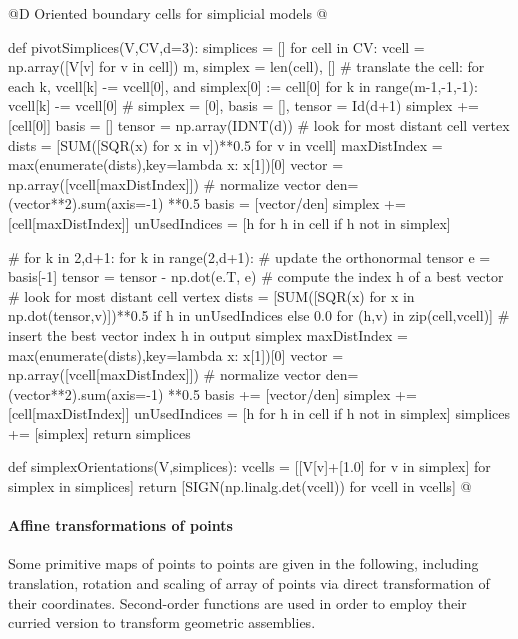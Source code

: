 \documentclass[11pt,oneside]{article}    %
\begin{document}
@D Oriented boundary cells for simplicial models
@{def pivotSimplices(V,CV,d=3):
    simplices = []
    for cell in CV:
        vcell = np.array([V[v] for v in cell])
        m, simplex = len(cell), []
        # translate the cell: for each k, vcell[k] -= vcell[0], and simplex[0] := cell[0]
        for k in range(m-1,-1,-1): vcell[k] -= vcell[0]
        # simplex = [0], basis = [], tensor = Id(d+1)
        simplex += [cell[0]]
        basis = []
        tensor = np.array(IDNT(d))
        # look for most distant cell vertex
        dists = [SUM([SQR(x) for x in v])**0.5 for v in vcell]
        maxDistIndex = max(enumerate(dists),key=lambda x: x[1])[0]
        vector = np.array([vcell[maxDistIndex]])
        # normalize vector
        den=(vector**2).sum(axis=-1) **0.5
        basis = [vector/den]
        simplex += [cell[maxDistIndex]]
        unUsedIndices = [h for h in cell if h not in simplex]
        
        # for k in {2,d+1}:
        for k in range(2,d+1):
            # update the orthonormal tensor
            e = basis[-1]
            tensor = tensor - np.dot(e.T, e)
            # compute the index h of a best vector
            # look for most distant cell vertex
            dists = [SUM([SQR(x) for x in np.dot(tensor,v)])**0.5
            if h in unUsedIndices else 0.0
            for (h,v) in zip(cell,vcell)]
            # insert the best vector index h in output simplex
            maxDistIndex = max(enumerate(dists),key=lambda x: x[1])[0]
            vector = np.array([vcell[maxDistIndex]])
            # normalize vector
            den=(vector**2).sum(axis=-1) **0.5
            basis += [vector/den]
            simplex += [cell[maxDistIndex]]
            unUsedIndices = [h for h in cell if h not in simplex]
        simplices += [simplex]
    return simplices

def simplexOrientations(V,simplices):
    vcells = [[V[v]+[1.0] for v in simplex] for simplex in simplices]
    return [SIGN(np.linalg.det(vcell)) for vcell in vcells]
@}


\paragraph{Affine transformations of points} Some primitive maps of points to points are given in the following, including translation, rotation and scaling of array of points via direct transformation of their coordinates. Second-order functions are used in order to employ their curried version to transform geometric assemblies.
\end{document}
